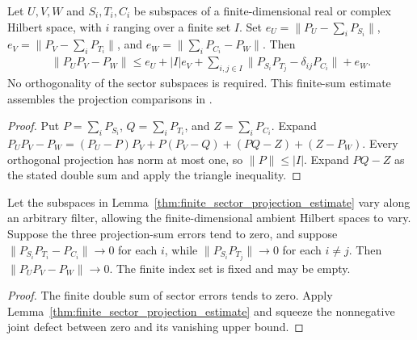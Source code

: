 \begin{lemma}
    \label{thm:finite_sector_projection_estimate}
    \leanok
    Let $U,V,W$ and $S_i,T_i,C_i$ be subspaces of a finite-dimensional
    real or complex Hilbert space, with $i$ ranging over a finite set $I$.
    Set
    $e_U=\|P_U-\sum_iP_{S_i}\|$,
    $e_V=\|P_V-\sum_iP_{T_i}\|$, and
    $e_W=\|\sum_iP_{C_i}-P_W\|$. Then
    \begin{align}
        \|P_UP_V-P_W\|
        \leq e_U+|I|e_V+
        \sum_{i,j\in I}\|P_{S_i}P_{T_j}-\delta_{ij}P_{C_i}\|+e_W.
    \end{align}
    No orthogonality of the sector subspaces is required.
    This finite-sum estimate assembles the projection comparisons in
    \cite[Lemmas~commutation(ii) and disjoint]{Nachtergaele1996Spectral}.
\end{lemma}
\begin{proof}\leanok
    Put $P=\sum_iP_{S_i}$, $Q=\sum_iP_{T_i}$, and $Z=\sum_iP_{C_i}$.
    Expand
    $P_UP_V-P_W=(P_U-P)P_V+P(P_V-Q)+(PQ-Z)+(Z-P_W)$.
    Every orthogonal projection has norm at most one, so $\|P\|\leq|I|$.
    Expand $PQ-Z$ as the stated double sum and apply the triangle inequality.
\end{proof}

\begin{lemma}
    \label{thm:sector_projection_defect_limit}
    \leanok
    Let the subspaces in Lemma~\ref{thm:finite_sector_projection_estimate}
    vary along an arbitrary filter, allowing the finite-dimensional ambient
    Hilbert spaces to vary. Suppose the three projection-sum errors tend to
    zero, and suppose $\|P_{S_i}P_{T_i}-P_{C_i}\|\to0$ for each $i$, while
    $\|P_{S_i}P_{T_j}\|\to0$ for each $i\ne j$.
    Then $\|P_UP_V-P_W\|\to0$.
    The finite index set is fixed and may be empty.
\end{lemma}
\begin{proof}\leanok
    The finite double sum of sector errors tends to zero.
    Apply Lemma~\ref{thm:finite_sector_projection_estimate} and squeeze the
    nonnegative joint defect between zero and its vanishing upper bound.
\end{proof}

